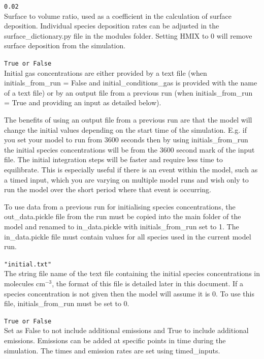 \documentclass[a4paper]{refart}
\begin{document}
\texttt{0.02}\\
Surface to volume ratio, used as a coefficient in the calculation of surface deposition. Individual species deposition rates can be adjusted in the surface\_dictionary.py  file in the modules folder. Setting HMIX to 0 will remove surface deposition from the simulation.

\label{initials_from_run}
\texttt{True or False}\\
Initial gas concentrations are either provided by a text file (when initials\_from\_run = False and initial\_conditions\_gas is provided with the name of a text file) or by an output file from a previous run (when initials\_from\_run = True and providing an input as detailed below). 

The benefits of using an output file from a previous run are that the model will change the initial values depending on the start time of the simulation. E.g. if you set your model to run from 3600 seconds then by using initials\_from\_run the initial species concentrations will be from the 3600 second mark of the input file. The initial integration steps will be faster and require less time to equilibrate. This is especially useful if there is an event within the model, such as a timed input, which you are varying on multiple model runs and wish only to run the model over the short period where that event is occurring. 

To use data from a previous run for initialising species concentrations, the out\_data.pickle file from the run must be copied into the main folder of the model and renamed to in\_data.pickle with initials\_from\_run set to 1. The in\_data.pickle file must contain values for all species used in the current model run.

\texttt{"initial.txt"}\\
The string file name of the text file containing the initial species concentrations in molecules cm$^{-3}$, the format of this file is detailed later in this document. If a species concentration is not given then the model will assume it is 0. To use this file, initials\_from\_run must be set to 0.

\label{timed emissions}
\texttt{True or False}\\
Set as False to not include additional emissions and True to include additional emissions. Emissions can be added at specific points in time during the simulation. The times and emission rates are set using timed\_inputs.
\end{document}
